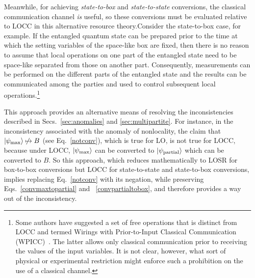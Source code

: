 \documentclass[12pt]{article}
\newcommand{\rob}{\color{black}}
\newcommand{\blk}{\color{black}}
\newcommand{\ket}[1]{\left| #1 \right>}
\theoremstyle{plain}
\theoremstyle{definition}
\begin{document}
       
Meanwhile, for achieving {\em state-to-box} and {\em state-to-state} conversions, the classical communication channel {\em is} useful, so these conversions \rob must be evaluated relative to LOCC in this alternative resource theory.\blk Consider the state-to-box case, for example.  If the entangled quantum state can be prepared prior to the time at which the setting variables of the \rob space-like \blk box are fixed, then there is no reason to assume that local operations on one part of the entangled state need to be space-like separated from those on another part.  Consequently, measurements can be performed on the different parts of the entangled state and the results can be communicated among the parties and used to control subsequent local operations.\footnote{Some authors have suggested a set of free operations that is distinct from LOCC and termed Wirings with Prior-to-Input Classical Communication (WPICC)~\cite{WPICC}.  The latter allows only classical communication prior to receiving the values of the input variables.  It is not clear, however, what sort of physical or experimental restriction might enforce such a prohibition on the use of a classical channel.} 

This approach provides an alternative means of resolving 
 the inconsistencies described in Secs.~\ref{sec:anomalies} and \ref{sec:multipartite}.  
 For instance, in the inconsistency associated with the anomaly of nonlocality,
 the claim that $\ket{\psi_{\rm max}} \not\mapsto B$ (see Eq.~\eqref{notconv}), which is true for LO, is not true for LOCC, because under LOCC, $\ket{\psi_{\rm max}}$ can be converted to $\ket{\psi_{\rm partial}}$ which can be converted to $B$. So this approach, which reduces mathematically to LOSR for box-to-box conversions but LOCC for state-to-state and state-to-box conversions, implies replacing Eq.~\eqref{notconv} with its negation, while preserving Eqs.~\eqref{convmaxtopartial} and ~\eqref{convpartialtobox}, and therefore provides a
  way out of the inconsistency.
\end{document}
